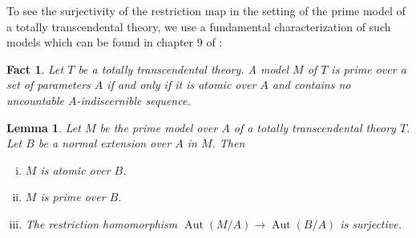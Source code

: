 \documentclass{article}
\theoremstyle{problemstyle}
\newtheorem{lemma}[problem]{Lemma}
\newtheorem{fact}[problem]{Fact}
\DeclareMathOperator{\aut}{Aut} %
\begin{document}
To see the surjectivity of the restriction map in the setting of the prime model of a totally transcendental theory, we use a fundamental characterization of such models which can be found in chapter 9 of \cite{tent_ziegler_2012}: 

\begin{fact}\label{primemodelchar}
    Let $T$ be a totally transcendental theory. A model $M$ of $T$ is prime over a set of parameters $A$ if and only if it is atomic over $A$ and contains no uncountable $A$-indiscernible sequence.
\end{fact}

\begin{lemma}
    Let $M$ be the prime model over $A$ of a totally transcendental theory $T$. Let $B$ be a normal extension over $A$ in $M$. Then
    \begin{enumerate}[(i)]
        \item $M$ is atomic over $B$.
        \item $M$ is prime over $B$.
        \item The restriction homomorphism $\aut(M/A) \to \aut(B/A)$ is surjective.
    \end{enumerate}
\end{lemma}
\end{document}
